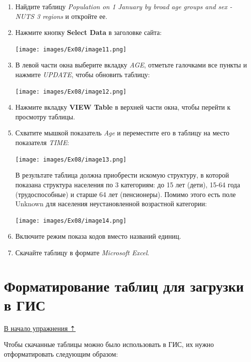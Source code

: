 \documentclass[12pt,]{book}
\begin{document}
\begin{enumerate}
\def\labelenumi{\arabic{enumi}.}
\item
  Найдите таблицу \emph{Population on 1 January by broad age groups and sex - NUTS 3 regions} и откройте ее.
\item
  Нажмите кнопку \textbf{Select Data} в заголовке сайта:

  \texttt{[image: images/Ex08/image11.png]}
\item
  В левой части окна выберите вкладку \emph{AGE}, отметьте галочками все пункты и нажмите \emph{UPDATE}, чтобы обновить таблицу:

  \texttt{[image: images/Ex08/image12.png]}
\item
  Нажмите вкладку \textbf{VIEW Table} в верхней части окна, чтобы перейти к просмотру таблицы.
\item
  Схватите мышкой показатель \emph{Age} и переместите его в таблицу на место показателя \emph{TIME}:

  \texttt{[image: images/Ex08/image13.png]}

  В результате таблица должна приобрести искомую структуру, в которой показана структура населения по 3 категориям: до 15 лет (дети), 15-64 года (трудоспособные) и старше 64 лет (пенсионеры). Помимо этого есть поле Unknown для населения неустановленной возрастной категории:

  \texttt{[image: images/Ex08/image14.png]}
\item
  Включите режим показа кодов вместо названий единиц.
\item
  Скачайте таблицу в формате \emph{Microsoft Excel}.
\end{enumerate}

\hypertarget{stat-map-economic-formatting}{%
\section{Форматирование таблиц для загрузки в ГИС}\label{stat-map-economic-formatting}}

\protect\hyperlink{stat-map-economic}{В начало упражнения ⇡}

Чтобы скачанные таблицы можно было использовать в ГИС, их нужно отформатировать следующим образом:
\end{document}
